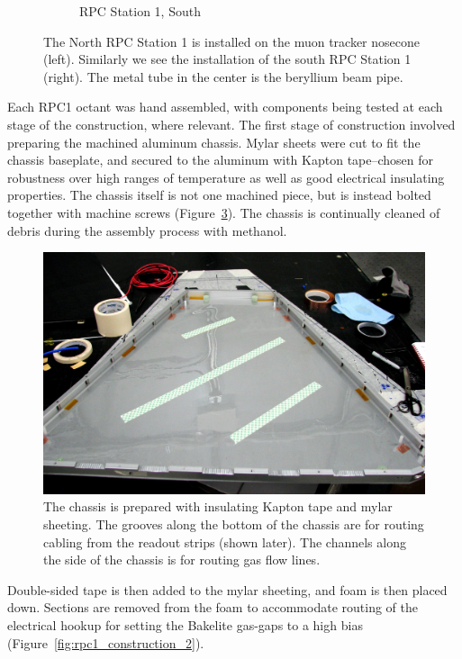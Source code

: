 \begin{figure}
\begin{subfigure}[b]{0.5\textwidth}
    \caption{RPC Station 1, South}
    \label{fig:rpc1s}
  \end{subfigure}
  \caption{
    The North RPC Station 1 is installed on the muon tracker nosecone (left).
    Similarly we see the installation of the south RPC Station 1 (right). The
    metal tube in the center is the beryllium beam pipe.
  }
  \label{fig:rpc1_installed}
\end{figure}

Each RPC1 octant was hand assembled, with components being tested at each stage
of the construction, where relevant. The first stage of construction involved
preparing the machined aluminum chassis. Mylar sheets were cut to fit the
chassis baseplate, and secured to the aluminum with Kapton tape--chosen for
robustness over high ranges of temperature as well as good electrical insulating
properties. The chassis itself is not one machined piece, but is instead bolted
together with machine screws (Figure~\ref{fig:rpc1_construction_1}). The chassis
is continually cleaned of debris during the assembly process with methanol.

\begin{figure}
  \centering
  \includegraphics[width=0.7\linewidth]{./figures/rpc1_construction_1}
  \caption{
    The chassis is prepared with insulating Kapton tape and mylar sheeting. The
    grooves along the bottom of the chassis are for routing cabling from the
    readout strips (shown later). The channels along the side of the chassis is
    for routing gas flow lines.
  }
  \label{fig:rpc1_construction_1}
\end{figure}

Double-sided tape is then added to the mylar sheeting, and foam is then placed
down. Sections are removed from the foam to accommodate routing of the
electrical hookup for setting the Bakelite gas-gaps to a high bias
(Figure~\ref{fig:rpc1_construction_2}).

